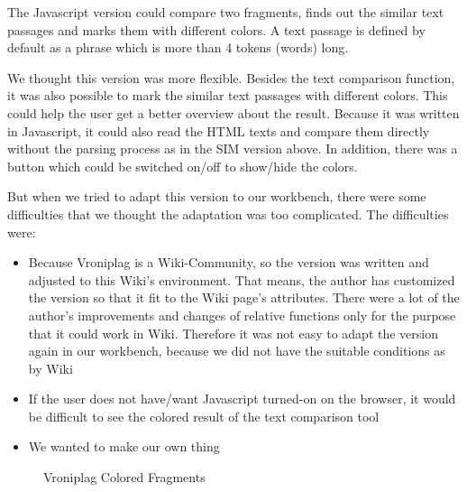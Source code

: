 The Javascript version could compare two fragments, finds out the similar text passages and marks them with different colors. A text passage is defined by default as a phrase which is more than 4 tokens (words) long.

We thought this version was more flexible. Besides the text comparison function, it was also possible to mark the similar text passages with different colors. This could help the user get a better overview about the result. Because it was written in Javascript, it could also read the HTML texts and compare them directly without the parsing process as in the SIM version above. In addition, there was a button which could be switched on/off to show/hide the colors.

But when we tried to adapt this version to our workbench, there were some difficulties that we thought the adaptation was too complicated. The difficulties were:
\begin{itemize}
\item Because Vroniplag is a Wiki-Community, so the version was written and adjusted to this Wiki’s environment. That means, the author has customized the version so that it fit to the Wiki page’s attributes. There were a lot of the author’s improvements and changes of relative functions only for the purpose that it could work in Wiki. Therefore it was not easy to adapt the version again in our workbench, because we did not have the suitable conditions as by Wiki
\item If the user does not have/want Javascript turned-on on the browser, it would be difficult to see the colored result of the text comparison tool
\item We wanted to make our own thing
\end{itemize}

\begin{figure}[!h]
  \centering
  \caption{Vroniplag Colored Fragments}
  \label{fig:Vroniplag_Colored_Fragments}
\end{figure}

